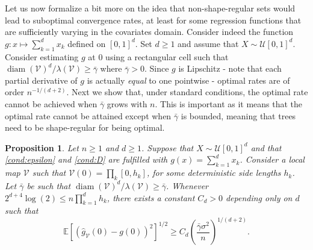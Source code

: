 \documentclass[paper=a4, fontsize=11pt]{scrartcl}
\newcommand{\diam}{\operatorname{diam}}
\newcommand{\EE}{\mathbb{E}}
\newtheorem{proposition}[theorem]{Proposition}
\begin{document}
Let us now formalize a bit more on the idea that non-shape-regular sets would lead to suboptimal convergence rates, at least for some regression functions that are sufficiently varying in the covariates domain. Consider indeed the function $g:x\mapsto \sum_{k=1} ^d x_k $ defined on $[0,1]^d$. Set $d\geq 1$ and assume that $X \sim \mathcal U [0,1]^d$. Consider estimating $g$ at $0$ using a rectangular cell such that $\diam(\mathcal V)^d/ \lambda (\mathcal V) \geq \bar {\gamma}$ where $\bar {\gamma} >0$. Since $g$ is Lipschitz - note that each partial derivative of $g$ is actually \textit{equal} to one pointwise - optimal rates are of order $ n^{ - 1/(d+2)}$. Next we show that, under standard conditions, the optimal rate cannot be achieved when $\bar \gamma $ grows with $n$. This is important as it means that the optimal rate cannot be attained except when $\bar{\gamma}$ is bounded, meaning that trees need to be shape-regular for being optimal. 


\begin{proposition}\label{contre_ex}
Let $n\geq 1$ and $d\geq 1$. Suppose that $X \sim \mathcal U [0,1]^d$ and that \ref{cond:epsilon} and \ref{cond:D} are fulfilled with $ g(x) = \sum_{k=1} ^d x_k$. Consider a local map $\mathcal V$ such that $ \mathcal V(0) = \prod_k[0,h_k]$, for some deterministic side lengths $h_k$. Let $\bar{\gamma}$ be such that $\diam(\mathcal V)^d/ \lambda (\mathcal V) \geq \bar{\gamma}$. Whenever $2^{d+4} \log(2) \leq  n \prod_{k=1}^d h_k$, there exists a constant $C_d > 0$ depending only on $d$ such that $$   \EE [ ( \hat g_{\mathcal V} (0 ) -  g(0 ))^2 ]^{1/2}  \geq  C_d \left( \dfrac{\bar{\gamma} \sigma^2}{n} \right)^{1/(d+2)}. $$
\end{proposition}




\end{document}
